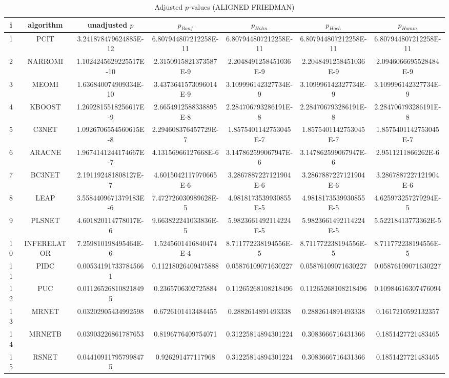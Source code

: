\documentclass[a4paper,10pt]{article}
\begin{document}
\begin{landscape}
\begin{table}[!htp]
\centering\scriptsize
\caption{Adjusted $p$-values (ALIGNED FRIEDMAN)}
\begin{tabular}{ccccccc}
i&algorithm&unadjusted $p$&$p_{Bonf}$&$p_{Holm}$&$p_{Hoch}$&$p_{Homm}$\\
\hline
1&PCIT&3.241878479624885E-12&6.807944807212258E-11&6.807944807212258E-11&6.807944807212258E-11&6.807944807212258E-11\\
2&NARROMI&1.1024245629225517E-10&2.3150915821373587E-9&2.2048491258451036E-9&2.2048491258451036E-9&2.0946066695528484E-9\\
3&MEOMI&1.636840074909334E-10&3.4373641573096014E-9&3.109996142327734E-9&3.109996142327734E-9&3.109996142327734E-9\\
4&KBOOST&1.2692815518256617E-9&2.6654912588338895E-8&2.284706793286191E-8&2.284706793286191E-8&2.284706793286191E-8\\
5&C3NET&1.0926706554560615E-8&2.294608376457729E-7&1.8575401142753045E-7&1.8575401142753045E-7&1.8575401142753045E-7\\
6&ARACNE&1.9674141244174667E-7&4.13156966127668E-6&3.147862599067947E-6&3.147862599067947E-6&2.9511211866262E-6\\
7&BC3NET&2.191192481808127E-7&4.6015042117970665E-6&3.2867887227121904E-6&3.2867887227121904E-6&3.2867887227121904E-6\\
8&LEAP&3.5584409671379183E-6&7.472726030989628E-5&4.9818173539930855E-5&4.9818173539930855E-5&4.625973257279294E-5\\
9&PLSNET&4.601820114778017E-6&9.663822241033836E-5&5.9823661492114224E-5&5.9823661492114224E-5&5.52218413773362E-5\\
10&INFERELATOR&7.259810198495464E-6&1.5245601416840474E-4&8.711772238194556E-5&8.711772238194556E-5&8.711772238194556E-5\\
11&PIDC&0.005341917337845661&0.11218026409475888&0.05876109071630227&0.05876109071630227&0.05876109071630227\\
12&PUC&0.011265268108218495&0.2365706302725884&0.11265268108218496&0.11265268108218496&0.10984616307476094\\
13&MRNET&0.03202905434992598&0.6726101413484455&0.2882614891493338&0.2882614891493338&0.1617210592132357\\
14&MRNETB&0.03903226861787653&0.8196776409754071&0.31225814894301224&0.3083666716431366&0.1851427721483465\\
15&RSNET&0.044109117957998475&0.926291477117968&0.31225814894301224&0.3083666716431366&0.1851427721483465\\

\end{tabular}
\end{table}
\end{landscape}
\end{document}
